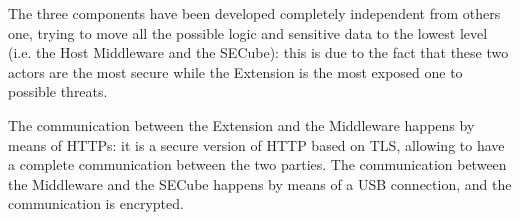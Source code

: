 The three components have been developed completely independent from others one, trying to move all the possible logic and sensitive data to the lowest level (i.e. the Host Middleware and the SECube): this is due to the fact that these two actors are the most secure while the Extension is the most exposed one to possible threats. \bigskip

The communication between the Extension and the Middleware happens by means of HTTPs: it is a secure version of HTTP based on TLS, allowing to have a complete communication between the two parties. The communication between the Middleware and the SECube happens by means of a USB connection, and the communication is encrypted. 

\label{sec:implementation-overview}
